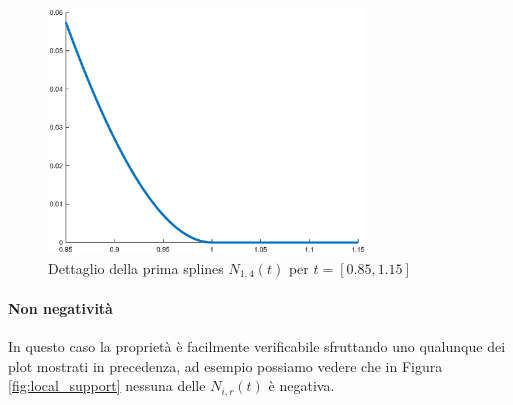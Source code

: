 \documentclass[a4paper, 10pt]{article}
\begin{document}
\begin{figure}[h]
  \centering
  \includegraphics[width=0.75\textwidth]{figure/first_property.eps}
  \caption{Dettaglio della prima splines $N_{1, 4}(t)$ per $t = [0.85, 1.15]$}
  \label{fig:first_property}
\end{figure} 
\paragraph{Non negatività} In questo caso la proprietà è facilmente verificabile sfruttando uno qualunque dei plot mostrati in precedenza,
 ad esempio possiamo vedere che in Figura \ref{fig:local_support} nessuna delle $N_{i, r}(t)$ è negativa.
\end{document}
